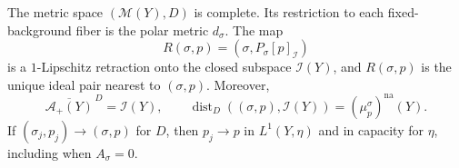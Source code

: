 \begin{theorem}\label{thm:joint-curve-model-completeness}
The metric space $(\mathscr M(Y),D)$ is complete. Its restriction to each fixed-background fiber is the polar metric $d_\sigma$. The map
\[
 R(\sigma,p)=(\sigma,P_\sigma[p]_{\mathcal I})
\]
is a $1$-Lipschitz retraction onto the closed subspace $\mathscr I(Y)$, and $R(\sigma,p)$ is the unique ideal pair nearest to $(\sigma,p)$. Moreover,
\begin{equation}\label{eq:joint-curve-analytic-closure}
 \overline{\mathscr A_+(Y)}^{\,D}=\mathscr I(Y),\qquad
 \operatorname{dist}_D((\sigma,p),\mathscr I(Y))
       =(\mu_p^\sigma)^{\mathrm{na}}(Y).
\end{equation}
If $(\sigma_j,p_j)\to(\sigma,p)$ for $D$, then $p_j\to p$ in $L^1(Y,\eta)$ and in capacity for $\eta$, including when $A_\sigma=0$.
\end{theorem}
